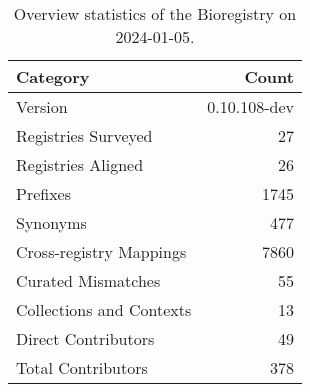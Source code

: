 \begin{table}
\caption{Overview statistics of the Bioregistry on 2024-01-05.}
\label{tab:bioregistry-summary}
\begin{tabular}{lr}
\toprule
Category & Count \\
\midrule
Version & 0.10.108-dev \\
Registries Surveyed & 27 \\
Registries Aligned & 26 \\
Prefixes & 1745 \\
Synonyms & 477 \\
Cross-registry Mappings & 7860 \\
Curated Mismatches & 55 \\
Collections and Contexts & 13 \\
Direct Contributors & 49 \\
Total Contributors & 378 \\
\bottomrule
\end{tabular}
\end{table}
